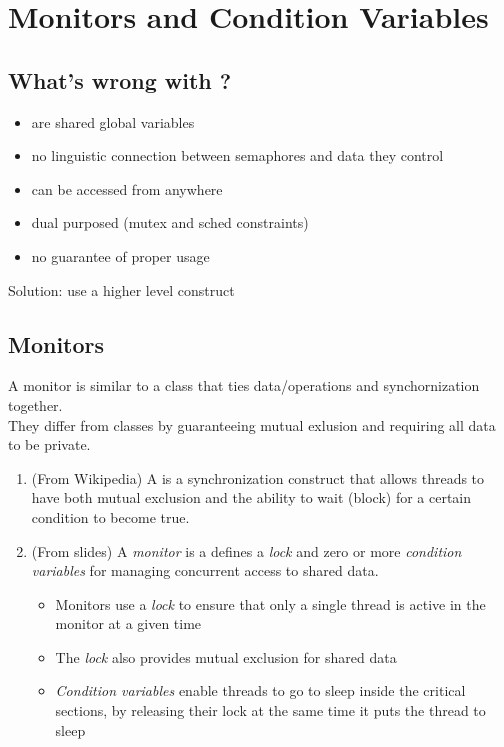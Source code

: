 \setcounter{chapter}{8}
\chapter{Monitors and Condition Variables}

\section{What's wrong with ?}
\begin{itemize}
    \item are shared global variables
    \item no linguistic connection between semaphores and data they control
    \item can be accessed from anywhere
    \item dual purposed (mutex and sched constraints)
    \item no guarantee of proper usage
\end{itemize}

Solution: use a higher level construct

\section{Monitors}
A monitor is similar to a class that ties data/operations and
synchornization together. \\

They differ from classes by guaranteeing mutual exlusion and requiring all data
to be private.

\begin{dfn} 
    \begin{enumerate}
        \item (From Wikipedia) A  is a synchronization construct
            that allows threads to have both mutual exclusion and the ability to
            wait (block) for a certain condition to become true.
        \item (From slides) A \emph{monitor} is a defines a \emph{lock} and zero
            or more \emph{condition variables} for managing concurrent access to
            shared data.
            \begin{itemize}
                \item Monitors use a \emph{lock} to ensure that only a single
                    thread is active in the monitor at a given time
                \item The \emph{lock} also provides mutual exclusion for shared
                    data
                \item \emph{Condition variables} enable threads to go to sleep
                    inside the critical sections, by releasing their lock at the
                    same time it puts the thread to sleep

            \end{itemize}
    \end{enumerate}
\end{dfn}

